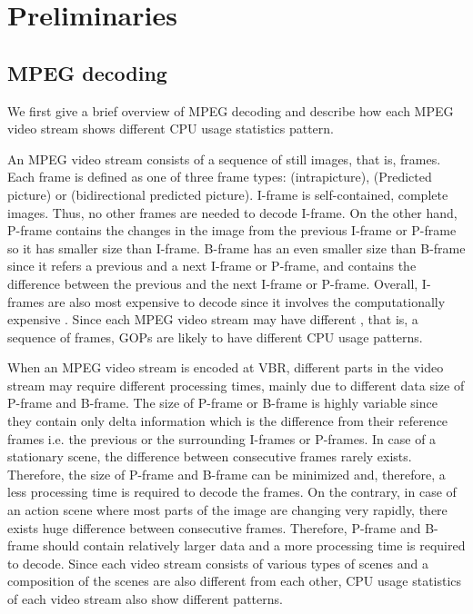 \section{Preliminaries}
\label{sec:preliminaries}

\subsection{MPEG decoding}
We first give a brief overview of MPEG decoding and describe how each MPEG video stream shows different CPU usage statistics pattern. 

An MPEG video stream consists of a sequence of still images, that is, frames. 
Each frame is defined as one of three frame types:  (intrapicture),  (Predicted picture) or  (bidirectional predicted picture).
I-frame is self-contained, complete images.  
Thus, no other frames are needed to decode I-frame.
On the other hand, P-frame contains the changes in the image from the previous I-frame or P-frame so it has smaller size than I-frame.
B-frame has an even smaller size than B-frame since it refers a previous and a next I-frame or P-frame, and contains the difference between the previous and the next I-frame or P-frame. 
Overall, I-frames are also most expensive to decode since it involves the computationally expensive .
Since each MPEG video stream may have different , that is, a sequence of frames, GOPs are likely to have different CPU usage patterns. 

When an MPEG video stream is encoded at VBR, different parts in the video stream may require different processing times, mainly due to different data size of P-frame and B-frame. 
The size of P-frame or B-frame is highly variable since they contain only delta information which is the difference from their reference frames i.e. the previous or the surrounding I-frames or P-frames.
In case of a stationary scene, the difference between consecutive frames rarely exists. 
Therefore, the size of P-frame and B-frame can be minimized and, therefore, a less processing time is required to decode the frames.
On the contrary, in case of an action scene where most parts of the image are changing very rapidly, there exists huge difference between consecutive frames.
Therefore, P-frame and B-frame should contain relatively larger data and a more processing time is required to decode.
Since each video stream consists of various types of scenes and a composition of the scenes are also different from each other, CPU usage statistics of each video stream also show different patterns. 

